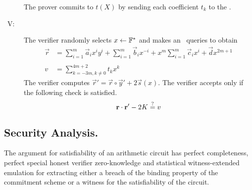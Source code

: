 \begin{description}
The prover commits to $t(X)$ by sending each coefficient $t_k$ to the \ILC.

\item[\ V:] The verifier randomly selects $x\gets \mathbb{F}^*$ and makes an \ILCopen\ queries to obtain
\begin{align*}
\vec{r} &= \sum_{i=1}^m\vec{a}_{i}x^{i} y^i+\sum_{i=1}^m\vec{b}_{i} x^{-i}+x^m \sum_{i=1}^m\vec{c}_{i} x^{i}+\vec{d}x^{2m+1}\\ \\
v &= \sum_{k=-3m,k \neq 0}^{4m+2}t_k x^{k}
\end{align*}
The verifier computes $\vec{r}'=\vec{r}\circ \vec{y}' +2\vec{s}(x)$. The verifier accepts only if the following check is satisfied.
$$\mathbf{r}\cdot \mathbf{r}'-2K \overset{?}{=} v$$
\end{description}

\subsection{Security Analysis.}
\begin{thm}\label{th:mainAC}
The argument for satisfiability of an arithmetic circuit has perfect completeness, perfect special honest verifier zero-knowledge and statistical witness-extended emulation for extracting either a breach of the binding property of the commitment scheme or a witness for the satisfiability of the circuit.
\end{thm}

